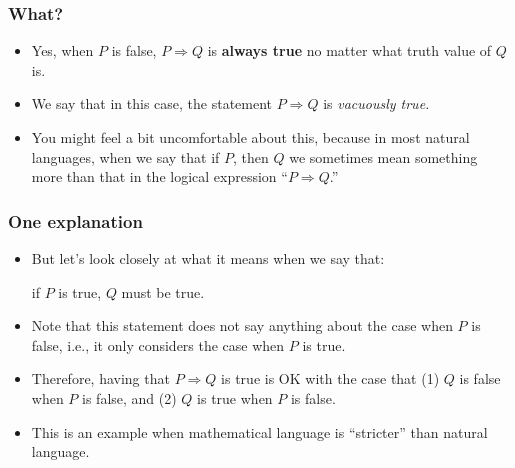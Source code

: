 \begin{frame}\frametitle{What?}
  \begin{itemize}
  \item
    Yes, when $P$ is false, $P\Rightarrow Q$ is {\bf always true} no
    matter what truth value of $Q$ is. 

  \item We say that in this case, the statement $P\Rightarrow Q$ is
    {\em vacuously true.}
    \pause

  \item
    You might feel a bit uncomfortable about this, because in most
    natural languages, when we say that if $P$, then $Q$ we sometimes
    mean something more than that in the logical expression
    ``$P\Rightarrow Q$.''
  \end{itemize}
\end{frame}

  
\begin{frame}\frametitle{One explanation}
  \begin{itemize}
  \item
    But let's look closely at what it means when we say that:

    \begin{tcolorbox}
      if $P$ is true, $Q$ must be true.
    \end{tcolorbox}

  \item
    Note that this statement does not say anything about the case when
    $P$ is false, i.e., it only considers the case when $P$ is true.
    \pause
    
  \item
    Therefore, having that $P\Rightarrow Q$ is true is OK with the
    case that (1) $Q$ is false when $P$ is false, and (2) $Q$ is true
    when $P$ is false.
    \pause
    
  \item
    This is an example when mathematical language is ``stricter'' than
    natural language.
  \end{itemize}
\end{frame}

